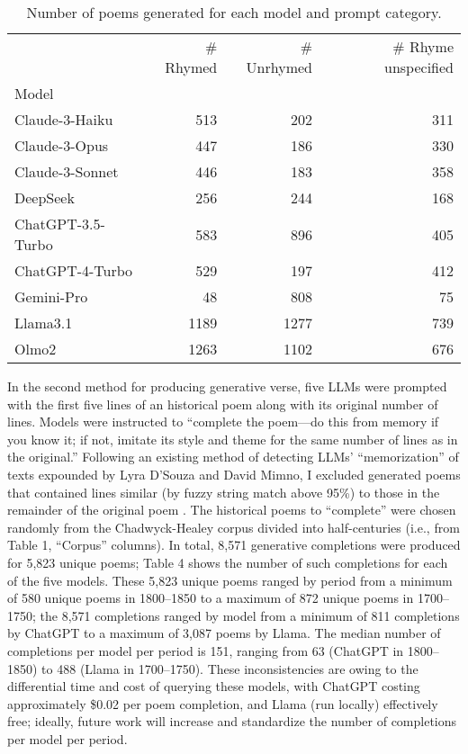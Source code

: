 \documentclass{simple-humanities}         %
\begin{document}
  \begin{table}[H]
    \centering
    \small
    \singlespacing
    \begin{tabular}{lrrr}
      \toprule
       & \# Rhymed & \# Unrhymed & \# Rhyme unspecified \\
      Model &  &  &  \\
      \midrule
      Claude-3-Haiku & 513 & 202 & 311 \\
      Claude-3-Opus & 447 & 186 & 330 \\
      Claude-3-Sonnet & 446 & 183 & 358 \\
      DeepSeek & 256 & 244 & 168 \\
      ChatGPT-3.5-Turbo & 583 & 896 & 405 \\
      ChatGPT-4-Turbo & 529 & 197 & 412 \\
      Gemini-Pro & 48 & 808 & 75 \\
      Llama3.1 & 1189 & 1277 & 739 \\
      Olmo2 & 1263 & 1102 & 676 \\
      \bottomrule
      \end{tabular}      
    \caption{Number of poems generated for each model and prompt category.}
    \label{tab:num_poems_models}
    \end{table}

In the second method for producing generative verse, five LLMs were prompted with the first five lines of an historical poem along with its original number of lines.
Models were instructed to ``complete the poem---do this from memory if you know it; if not, imitate its style and theme for the same number of lines as in the original.''
Following an existing method of detecting LLMs' ``memorization'' of texts expounded by Lyra D'Souza and David Mimno, I excluded generated poems that contained lines similar (by fuzzy string match above 95\%) to those in the remainder of the original poem \parencite{dsouzaChatbotCanonPoetry2023}.
The historical poems to ``complete'' were chosen randomly from the Chadwyck-Healey corpus divided into half-centuries (i.e., from Table 1, ``Corpus'' columns).
In total, 8,571 generative completions were produced for 5,823 unique poems; Table 4 shows the number of such completions for each of the five models.
These 5,823 unique poems ranged by period from a minimum of 580 unique poems in 1800--1850 to a maximum of 872 unique poems in 1700--1750; the 8,571 completions ranged by model from a minimum of 811 completions by ChatGPT to a maximum of 3,087 poems by Llama.
The median number of completions per model per period is 151, ranging from 63 (ChatGPT in 1800--1850) to 488 (Llama in 1700--1750).
These inconsistencies are owing to the differential time and cost of querying these models, with ChatGPT costing approximately \$0.02 per poem completion, and Llama (run locally) effectively free; ideally, future work will increase and standardize the number of completions per model per period.
\end{document}
